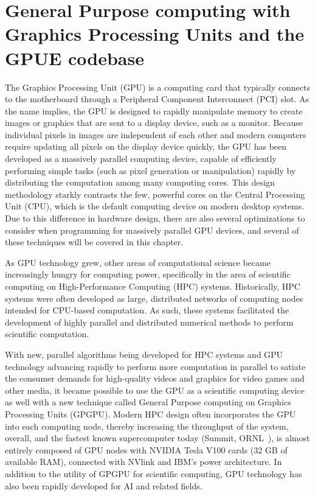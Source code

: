 \chapter{General Purpose computing with Graphics Processing Units and the GPUE codebase}
\label{ch:gpu}

The Graphics Processing Unit (GPU) is a computing card that typically connects to the motherboard through a Peripheral Component Interconnect (PCI) slot.
As the name implies, the GPU is designed to rapidly manipulate memory to create images or graphics that are sent to a display device, such as a monitor.
Because individual pixels in images are independent of each other and modern computers require updating all pixels on the display device quickly, the GPU has been developed as a massively parallel computing device, capable of efficiently performing simple tasks (such as pixel generation or manipulation) rapidly by distributing the computation among many computing cores.
This design methodology starkly contrasts the few, powerful cores on the Central Processing Unit (CPU), which is the default computing device on modern desktop systems.
Due to this difference in hardware design, there are also several optimizations to consider when programming for massively parallel GPU devices, and several of these techniques will be covered in this chapter.

As GPU technology grew, other areas of computational science became increasingly hungry for computing power, specifically in the area of scientific computing on High-Performance Computing (HPC) systems.
Historically, HPC systems were often developed as large, distributed networks of computing nodes intended for CPU-based computation.
As such, these systems facilitated the development of highly parallel and distributed numerical methods to perform scientific computation.

With new, parallel algorithms being developed for HPC systems and GPU technology advancing rapidly to perform more computation in parallel to satiate the consumer demands for high-quality videos and graphics for video games and other media, it became possible to use the GPU as a scientific computing device as well with a new technique called General Purpose computing on Graphics Processing Units (GPGPU).
Modern HPC design often incorporates the GPU into each computing node, thereby increasing the throughput of the system, overall, and the fastest known supercomputer today (Summit, ORNL~\cite{kahle2019}), is almost entirely composed of GPU nodes with NVIDIA Tesla V100 cards (32 GB of available RAM), connected with NVlink and IBM's power architecture.
In addition to the utility of GPGPU for scientific computing, GPU technology has also been rapidly developed for AI and related fields.

